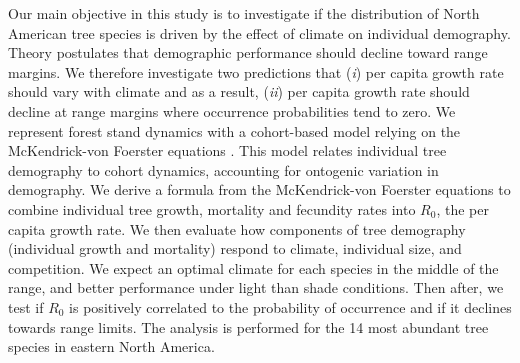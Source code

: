 Our main objective in this study is to investigate if the distribution of North American tree species is driven by the effect of climate on individual demography. Theory postulates that demographic performance should decline toward range margins. We therefore investigate two predictions that (\textit{i}) per capita growth rate should vary with climate and as a result, (\textit{ii}) per capita growth rate should decline at range margins where occurrence probabilities tend to zero. We represent forest stand dynamics with a cohort-based model relying on the McKendrick-von Foerster equations \citep{Strigul2008}. This model relates individual tree demography to cohort dynamics, accounting for ontogenic variation in demography. We derive a formula from the McKendrick-von Foerster equations to combine individual tree growth, mortality and fecundity rates into $ R_0 $, the per capita growth rate. We then evaluate how components of tree demography (individual growth and mortality) respond to climate, individual size, and competition. We expect an optimal climate for each species in the middle of the range, and better performance under light than shade conditions. Then after, we test if $ R_0 $ is positively correlated to the probability of occurrence and if it declines towards range limits. The analysis is performed for the 14 most abundant tree species in eastern North America.




